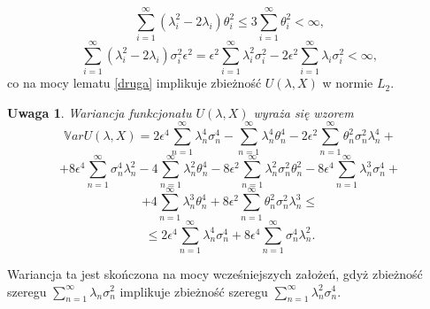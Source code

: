 \documentclass{mwart}
\newtheorem{uw}{Uwaga}
\begin{document}
\begin{displaymath}
\sum_{i=1}^{\infty}(\lambda_i^2-2\lambda_i)\theta_i^2\leq 3\sum_{i=1}^{\infty}\theta_i^2<\infty,
\end{displaymath}
\begin{displaymath}
\sum_{i=1}^{\infty}(\lambda_i^2-2\lambda_i)\sigma_i^2\epsilon^2=\epsilon^2\sum_{i=1}^{\infty}\lambda_i^2\sigma_i^2-2\epsilon^2\sum_{i=1}^{\infty}\lambda_i\sigma_i^2<\infty,
\end{displaymath}
co na mocy lematu \ref{druga} implikuje zbieżność $U(\lambda,X)$ w normie $L_2$.
\begin{uw}
Wariancja funkcjonału $U(\lambda,X)$ wyraża się wzorem
\begin{displaymath}
\mathbb{V}ar U(\lambda,X)=2\epsilon^4\sum_{n=1}^{\infty}\lambda_n^4\sigma_n^4-\sum_{n=1}^{\infty}\lambda_n^4\theta_n^4-2\epsilon^2\sum_{n=1}^{\infty}\theta_n^2\sigma_n^2\lambda_n^4+
\end{displaymath}
\begin{displaymath}
+8\epsilon^4\sum_{n=1}^{\infty}\sigma_n^4\lambda_n^2-4\sum_{n=1}^{\infty}\lambda_n^2\theta_n^4-8\epsilon^2\sum_{n=1}^{\infty}\lambda_n^2\sigma_n^2\theta_n^2-8\epsilon^4\sum_{n=1}^{\infty}\lambda_n^3\sigma_n^4+
\end{displaymath}
\begin{displaymath}
+4\sum_{n=1}^{\infty}\lambda_n^3\theta_n^4+8\epsilon^2\sum_{n=1}^{\infty}\theta_n^2\sigma_n^2\lambda_n^3\leq
\end{displaymath}
\begin{displaymath}
\leq 2\epsilon^4\sum_{n=1}^{\infty}\lambda_n^4\sigma_n^4+8\epsilon^4\sum_{n=1}^{\infty}\sigma_n^4\lambda_n^2.
\end{displaymath}
\end{uw}
Wariancja ta jest skończona na mocy wcześniejszych założeń, gdyż zbieżność szeregu $\sum_{n=1}^{\infty}\lambda_n\sigma_n^2$ implikuje zbieżność szeregu $\sum_{n=1}^{\infty}\lambda_n^2\sigma_n^4$.
\end{document}
